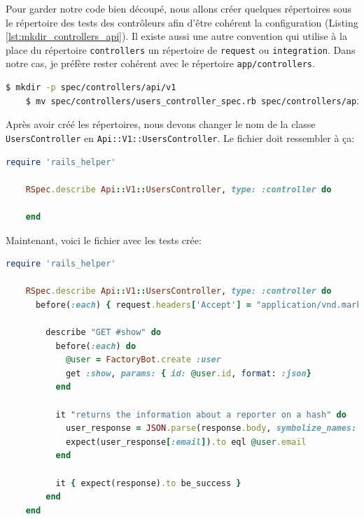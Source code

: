 \documentclass[]{report}
\begin{document}
    Pour garder notre code bien découpé, nous allons créer quelques répertoires sous le répertoire des tests des contrôleurs afin d'être cohérent la configuration (Listing \ref{lst:mkdir_controllers_api}). Il existe aussi une autre convention qui utilise à la place du répertoire \verb|controllers| un répertoire de \verb|request| ou \verb|integration|. Dans notre cas, je préfère rester cohérent avec le répertoire \verb|app/controllers|.


    \begin{scriptsize}
    \begin{lstlisting}[language=bash]
    $ mkdir -p spec/controllers/api/v1
    $ mv spec/controllers/users_controller_spec.rb spec/controllers/api/v1
    \end{lstlisting}
    \end{scriptsize}

    Après avoir créé les répertoires, nous devons changer le nom de la classe \verb|UsersController| en \verb|Api::V1::UsersController|. Le fichier doit ressembler à ça:

    \begin{scriptsize}
    \begin{lstlisting}[language=ruby]
    require 'rails_helper'

    RSpec.describe Api::V1::UsersController, type: :controller do

    end
    \end{lstlisting}
    \end{scriptsize}

    Maintenant, voici le fichier avec les tests crée:

    \begin{scriptsize}
    \begin{lstlisting}[language=ruby, caption={Le test du contrôlleur des utilisateur  (spec/controllers/api/v1/users\_controller\_spec.rb)}, label={lst:add_show_test_to_users_controller_spec}]
    require 'rails_helper'

    RSpec.describe Api::V1::UsersController, type: :controller do
      before(:each) { request.headers['Accept'] = "application/vnd.marketplace.v1" }

        describe "GET #show" do
          before(:each) do
            @user = FactoryBot.create :user
            get :show, params: { id: @user.id, format: :json}
          end

          it "returns the information about a reporter on a hash" do
            user_response = JSON.parse(response.body, symbolize_names: true)
            expect(user_response[:email]).to eql @user.email
          end

          it { expect(response).to be_success }
        end
    end
    \end{lstlisting}
    \end{scriptsize}
\end{document}
